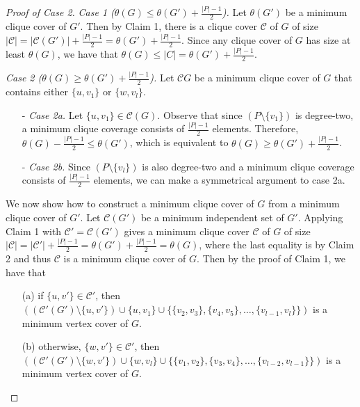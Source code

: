 \documentclass[../techreport.tex]{subfiles}
\begin{document}
\begin{proof}[Proof of Case 2]
	\noindent\emph{Case 1 ($\theta(G) \leq \theta(G') + \frac{|P| - 1}{2}$).} Let $\theta(G')$ be a minimum clique cover of $G'$. Then by Claim 1, there is a clique cover $\mathcal{C}$ of $G$ of size $|\mathcal{C}| = |\mathcal{C}(G')| + \frac{|P| - 1}{2} = \theta(G') + \frac{|P| - 1}{2}$. Since any clique cover of $G$ has size at least $\theta(G)$, we have that $\theta(G) \leq |C| = \theta(G') + \frac{|P| - 1}{2}$.

	\noindent\emph{Case 2 ($\theta(G) \geq \theta(G') + \frac{|P| - 1}{2}$).} Let $\mathcal{C}{G}$ be a minimum clique cover of $G$ that contains either $\{u, v_1\}$ or $\{w, v_l\}$.
	\begin{itemize}
		\item[-] \emph{Case 2a.} Let $\{u, v_1\} \in \mathcal{C}(G)$. Observe that since $(P \setminus \{v_1\})$ is degree-two, a minimum clique coverage consists of $\frac{|P| - 1}{2}$ elements. Therefore, $\theta(G) - \frac{|P| - 1}{2} \leq \theta(G')$, which is equivalent to $\theta(G) \geq \theta(G') + \frac{|P| - 1}{2}$.
		\item[-] \emph{Case 2b.} Since $(P \setminus \{v_l\})$ is also degree-two and a minimum clique coverage consists of $\frac{|P| - 1}{2}$ elements, we can make a symmetrical argument to case 2a.
	\end{itemize}


	We now show how to construct a minimum clique cover of $G$ from a minimum clique cover of $G'$. Let $\mathcal{C}(G')$ be a minimum independent set of $G'$. Applying Claim 1 with $\mathcal{C'} = \mathcal{C}(G')$ gives a minimum clique cover $\mathcal{C}$ of $G$ of size $|\mathcal{C}| = |\mathcal{C'}| + \frac{|P| - 1}{2} = \theta(G') + \frac{|P| - 1}{2} = \theta(G)$, where the last equality is by Claim 2 and thus $\mathcal{C}$ is a minimum clique cover of $G$. Then by the proof of Claim 1, we have that
	\begin{itemize}
		\item[(a)] if $\{u, v'\} \in \mathcal{C'}$, then $((\mathcal{C'}(G') \setminus \{u, v'\}) \cup \{u, v_1\} \cup \{\{v_2, v_3\}, \{v_4, v_5\}, \dots, \{v_{l-1}, v_l\}\})$ is a minimum vertex cover of $G$.
		\item[(b)] otherwise, $\{w, v'\} \in \mathcal{C'}$, then $((\mathcal{C'}(G') \setminus \{w, v'\}) \cup \{w, v_l\} \cup \{\{v_1, v_2\}, \{v_3, v_4\}, \dots, \{v_{l-2}, v_{l-1}\}\})$ is a minimum vertex cover of $G$.
	\end{itemize}
\end{proof}

\end{document}
